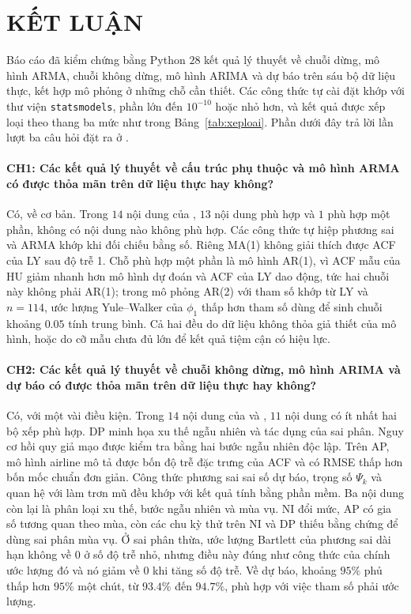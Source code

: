 \clearpage
\section[Kết luận]{KẾT LUẬN}

Báo cáo đã kiểm chứng bằng Python $28$ kết quả lý thuyết về chuỗi dừng, mô hình ARMA, chuỗi không dừng, mô hình ARIMA và dự báo trên sáu bộ dữ liệu thực, kết hợp mô phỏng ở những chỗ cần thiết. Các công thức tự cài đặt khớp với thư viện \texttt{statsmodels}, phần lớn đến $10^{-10}$ hoặc nhỏ hơn, và kết quả được xếp loại theo thang ba mức như trong Bảng~\ref{tab:xeploai}. Phần dưới đây trả lời lần lượt ba câu hỏi đặt ra ở .

\paragraph{CH1: Các kết quả lý thuyết về cấu trúc phụ thuộc và mô hình ARMA có được thỏa mãn trên dữ liệu thực hay không?}
Có, về cơ bản. Trong $14$ nội dung của , $13$ nội dung phù hợp và $1$ phù hợp một phần, không có nội dung nào không phù hợp. Các công thức tự hiệp phương sai và ARMA khớp khi đối chiếu bằng số. Riêng MA(1) không giải thích được ACF của LY sau độ trễ 1. Chỗ phù hợp một phần là mô hình AR(1), vì ACF mẫu của HU giảm nhanh hơn mô hình dự đoán và ACF của LY dao động, tức hai chuỗi này không phải AR(1); trong mô phỏng AR(2) với tham số khớp từ LY và $n=114$, ước lượng Yule--Walker của $\phi_1$ thấp hơn tham số dùng để sinh chuỗi khoảng $0.05$ tính trung bình. Cả hai đều do dữ liệu không thỏa giả thiết của mô hình, hoặc do cỡ mẫu chưa đủ lớn để kết quả tiệm cận có hiệu lực.

\paragraph{CH2: Các kết quả lý thuyết về chuỗi không dừng, mô hình ARIMA và dự báo có được thỏa mãn trên dữ liệu thực hay không?}
Có, với một vài điều kiện. Trong $14$ nội dung của  và , $11$ nội dung có ít nhất hai bộ xếp phù hợp. DP minh họa xu thế ngẫu nhiên và tác dụng của sai phân. Nguy cơ hồi quy giả mạo được kiểm tra bằng hai bước ngẫu nhiên độc lập. Trên AP, mô hình airline mô tả được bốn độ trễ đặc trưng của ACF và có RMSE thấp hơn bốn mốc chuẩn đơn giản. Công thức phương sai sai số dự báo, trọng số $\Psi_k$ và quan hệ với làm trơn mũ đều khớp với kết quả tính bằng phần mềm. Ba nội dung còn lại là phân loại xu thế, bước ngẫu nhiên và mùa vụ. NI đổi mức, AP có gia số tương quan theo mùa, còn các chu kỳ thử trên NI và DP thiếu bằng chứng để dùng sai phân mùa vụ. Ở sai phân thừa, ước lượng Bartlett của phương sai dài hạn không về $0$ ở số độ trễ nhỏ, nhưng điều này đúng như công thức của chính ước lượng đó và nó giảm về $0$ khi tăng số độ trễ. Về dự báo, khoảng $95\%$ phủ thấp hơn $95\%$ một chút, từ $93.4\%$ đến $94.7\%$, phù hợp với việc tham số phải ước lượng.

